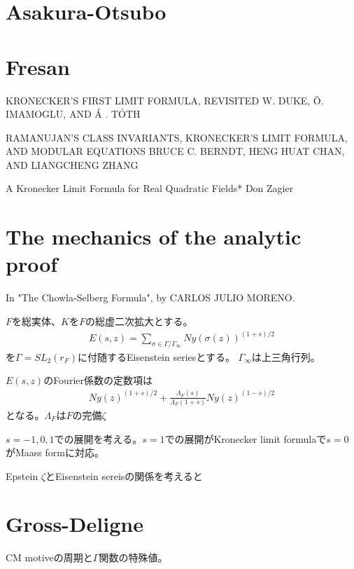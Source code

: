 \documentclass{jsarticle}
\begin{document}
\section{Asakura-Otsubo}

\section{Fresan}

KRONECKER’S FIRST LIMIT FORMULA, REVISITED
W. DUKE, \"O. IMAMOGLU, AND \'A . T\'OTH


RAMANUJAN’S CLASS INVARIANTS, KRONECKER’S LIMIT FORMULA, AND MODULAR EQUATIONS
BRUCE C. BERNDT, HENG HUAT CHAN, AND LIANGCHENG ZHANG


A Kronecker Limit Formula for Real Quadratic Fields* Don Zagier

\section{The mechanics of the analytic proof}
In "The Chowla-Selberg Formula", by CARLOS JULIO MORENO.

$F$を総実体、$K$を$F$の総虚二次拡大とする。
\begin{align*}
E(s,z)=\sum_{\sigma\in\Gamma/\Gamma_\infty}Ny(\sigma(z))^{(1+s)/2}
\end{align*}
を$\Gamma=SL_2(r_F)$に付随するEisenstein seriesとする。
$\Gamma_\infty$は上三角行列。

$E(s,z)$のFourier係数の定数項は
\begin{align*}
Ny(z)^{(1+s)/2}+\frac{\Lambda_F(s)}{\Lambda_F(1+s)}Ny(z)^{(1-s)/2}
\end{align*}
となる。$\Lambda_F$は$F$の完備$\zeta$

$s=-1, 0 , 1$での展開を考える。$s=1$での展開がKronecker limit formulaで$s=0$がMaass formに対応。

Epstein $\zeta$とEisenstein sereisの関係を考えると

\section{Gross-Deligne}
CM motiveの周期と$\Gamma$関数の特殊値。
\end{document}
